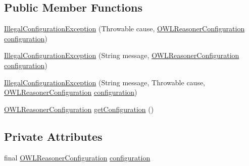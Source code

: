 \subsection*{Public Member Functions}
\begin{DoxyCompactItemize}
\item 
\hyperlink{classorg_1_1semanticweb_1_1owlapi_1_1reasoner_1_1_illegal_configuration_exception_a231c51f6f45af73fad0e5a9b1cdfa5d6}{Illegal\-Configuration\-Exception} (Throwable cause, \hyperlink{interfaceorg_1_1semanticweb_1_1owlapi_1_1reasoner_1_1_o_w_l_reasoner_configuration}{O\-W\-L\-Reasoner\-Configuration} \hyperlink{classorg_1_1semanticweb_1_1owlapi_1_1reasoner_1_1_illegal_configuration_exception_a9dbe5770f4907b41a49c62112c89ad4b}{configuration})
\item 
\hyperlink{classorg_1_1semanticweb_1_1owlapi_1_1reasoner_1_1_illegal_configuration_exception_a23b0557fb0811d37356311ac8d7ca7f1}{Illegal\-Configuration\-Exception} (String message, \hyperlink{interfaceorg_1_1semanticweb_1_1owlapi_1_1reasoner_1_1_o_w_l_reasoner_configuration}{O\-W\-L\-Reasoner\-Configuration} \hyperlink{classorg_1_1semanticweb_1_1owlapi_1_1reasoner_1_1_illegal_configuration_exception_a9dbe5770f4907b41a49c62112c89ad4b}{configuration})
\item 
\hyperlink{classorg_1_1semanticweb_1_1owlapi_1_1reasoner_1_1_illegal_configuration_exception_a0bab26cd52ce2250e66dcfe4962a6b23}{Illegal\-Configuration\-Exception} (String message, Throwable cause, \hyperlink{interfaceorg_1_1semanticweb_1_1owlapi_1_1reasoner_1_1_o_w_l_reasoner_configuration}{O\-W\-L\-Reasoner\-Configuration} \hyperlink{classorg_1_1semanticweb_1_1owlapi_1_1reasoner_1_1_illegal_configuration_exception_a9dbe5770f4907b41a49c62112c89ad4b}{configuration})
\item 
\hyperlink{interfaceorg_1_1semanticweb_1_1owlapi_1_1reasoner_1_1_o_w_l_reasoner_configuration}{O\-W\-L\-Reasoner\-Configuration} \hyperlink{classorg_1_1semanticweb_1_1owlapi_1_1reasoner_1_1_illegal_configuration_exception_a1cf8fa0bee8f350f4615e879d511a087}{get\-Configuration} ()
\end{DoxyCompactItemize}
\subsection*{Private Attributes}
\begin{DoxyCompactItemize}
\item 
final \hyperlink{interfaceorg_1_1semanticweb_1_1owlapi_1_1reasoner_1_1_o_w_l_reasoner_configuration}{O\-W\-L\-Reasoner\-Configuration} \hyperlink{classorg_1_1semanticweb_1_1owlapi_1_1reasoner_1_1_illegal_configuration_exception_a9dbe5770f4907b41a49c62112c89ad4b}{configuration}
\end{DoxyCompactItemize}
